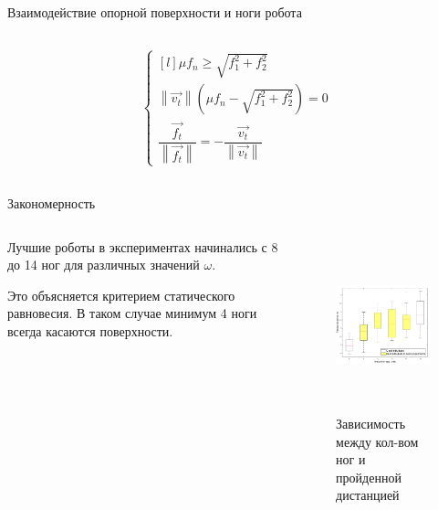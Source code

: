 \documentclass[aspectratio=169,xcolor=table,10pt]{beamer}
\begin{document}
\begin{frame}[t]{Взаимодействие опорной поверхности и ноги робота}
\begin{columns}[T,onlytextwidth]
\begin{column}{0.29\textwidth}
\begin{figure}[H]
                \label{fig:contact_interaction.png}
            \end{figure}
            \vspace{-1cm}
            \begin{align}
                \left\{\begin{matrix*}[l]
                           \mu f_n \geqslant \sqrt{f_1^2 + f_2^2}\\
                           \left\lVert \vec{v_t}\right\rVert (\mu f_n - \sqrt{f_1^2 + f_2^2}) = 0\\
                           \dfrac{\vec{f_t}}{\left\lVert \vec{f_t}\right\rVert } = - \dfrac{\vec{v_t}}{\left\lVert \vec{v_t}\right\rVert }
                       \end{matrix*}\right.
            \end{align}
        \end{column}
    \end{columns}
\end{frame}

\begin{frame}[t]{Закономерность}

    \begin{columns}[T,onlytextwidth]
        \begin{column}{0.49\textwidth}
            Лучшие роботы в экспериментах начинались с 8 до 14 ног для различных значений $\omega$.

            Это объясняется критерием статического равновесия. В таком случае минимум 4 ноги всегда касаются поверхности.
        \end{column}
        \begin{column}{0.49\textwidth}
            \begin{figure}[H]
                \centering\includegraphics[height=5cm,width=1\textwidth,keepaspectratio]{box_plot_structural_synthesis.png}
                \caption*{Зависимость между кол-вом ног и пройденной дистанцией}
            \end{figure}
        \end{column}
    \end{columns}
\end{frame}
\end{document}
